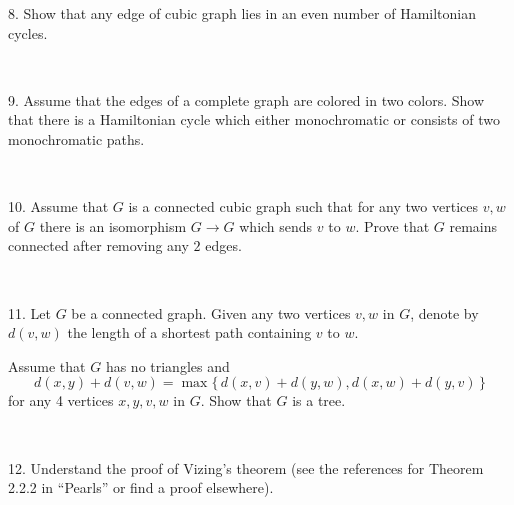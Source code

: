 \documentclass[oneside,a4paper]{article}
\begin{document}
\noindent %
{8.} %
Show that any edge of cubic graph lies in an even number of Hamiltonian cycles.


\ 

\noindent 
{9.}
Assume that the edges of a complete graph are colored in two colors.
Show that there is a Hamiltonian cycle which either monochromatic or consists of two monochromatic paths.

\ 

\noindent %
{10.}  %
Assume that $G$ is a connected cubic graph such that 
for any two vertices $v,w$ of $G$ there is an isomorphism
$G\to G$ which sends $v$ to $w$.
Prove that $G$ remains connected after removing any $2$ edges.

\ 


\noindent %
{11.} %
Let $G$ be a connected graph.
Given any two vertices $v,w$ in $G$, denote by $d(v,w)$ the length of a shortest path containing $v$ to $w$. 

Assume that $G$ has no triangles and
\[d(x,y)+d(v,w)=\max\{\,d(x,v)+d(y,w),d(x,w)+d(y,v)\,\}\]
for any 4 vertices $x,y,v,w$ in $G$.
Show that $G$ is a tree.

\ 

\noindent %
{12.} %
Understand the proof of Vizing's theorem (see the references for Theorem 2.2.2 in ``Pearls'' or find a proof elsewhere).
\end{document}
